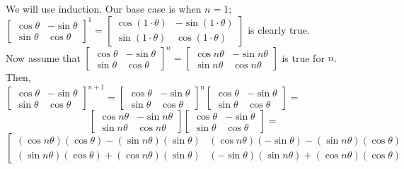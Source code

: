 \documentclass[12pt]{article}
\begin{document}
\begin{enumerate}
\begin{enumerate}
We will use induction. Our base case is when $n = 1$; \\
$\left[ \begin{array}{cc} \cos \theta & -\sin \theta \\ \sin \theta & \cos \theta \end{array} \right]^1 =
\left[ \begin{array}{cc} \cos (1\cdot\theta) & -\sin (1\cdot\theta) \\
\sin (1\cdot\theta) & \cos (1\cdot\theta) \end{array} \right]$ is clearly true. \\
Now assume that
$\left[ \begin{array}{cc} \cos \theta & -\sin \theta \\ \sin \theta & \cos \theta \end{array} \right]^n =
\left[ \begin{array}{cc} \cos n\theta & -\sin n\theta \\ \sin n\theta & \cos n\theta \end{array} \right]$ 
is true for $n$. Then, \\
$ \left[ \begin{array}{cc} \cos \theta & -\sin \theta \\ \sin \theta & \cos \theta 
\end{array} \right]^{n + 1} = \left[ \begin{array}{cc} \cos \theta & -\sin \theta \\ \sin \theta & \cos \theta 
\end{array} \right]^n 
\left[ \begin{array}{cc} \cos \theta & -\sin \theta \\ \sin \theta & \cos \theta \end{array} \right] = $
\[ \left[ \begin{array}{cc} \cos n\theta & -\sin n\theta \\ \sin n\theta & \cos n\theta \end{array} \right]
\left[ \begin{array}{cc} \cos \theta & -\sin \theta \\ \sin \theta & \cos \theta \end{array} \right] = \]
\[
\left[ \begin{array}{cc} (\cos n\theta)(\cos \theta) - (\sin n\theta)(\sin \theta)
& (\cos n\theta)(-\sin \theta) - (\sin n\theta)(\cos \theta) \\
(\sin n\theta)(\cos \theta) + (\cos n\theta)(\sin \theta)
& (-\sin \theta)(\sin n\theta) + (\cos n\theta)(\cos \theta)

\end{array}\]
\end{enumerate}
\end{enumerate}
\end{document}
